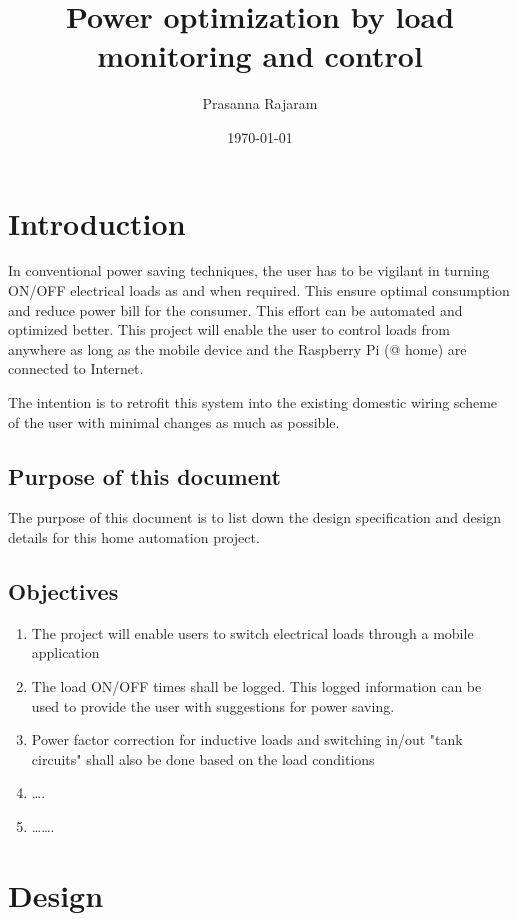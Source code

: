 \documentclass[11pt]{article}
\author{Prasanna Rajaram}
\date{\today}
\title{Power optimization by load monitoring and control}
\begin{document}
\maketitle
\tableofcontents

\section{Introduction}
\label{sec:org5ba7d53}
In conventional power saving techniques, the user has to be vigilant
in turning ON/OFF electrical loads as and when required. This ensure
optimal consumption and reduce power bill for the consumer. This
effort can be automated and optimized better. This project will enable
the user to control loads from anywhere as long as the mobile device
and the Raspberry Pi (@ home) are connected to Internet.  

The intention is to retrofit this system into the existing domestic
wiring scheme of the user with minimal changes as much as possible.

\subsection{Purpose of this document}
\label{sec:org6d773d9}
The purpose of this document is to list down the design specification
and design details for this home automation project. 

\subsection{Objectives}
\label{sec:orgab614ed}
\begin{enumerate}
\item The project will enable users to switch electrical loads through a
mobile application
\item The load ON/OFF times shall be logged. This logged information can
be used to provide the user with suggestions for power saving.
\item Power factor correction for inductive loads and switching in/out
"tank circuits" shall also be done based on the load conditions
\item \ldots{}.
\item \ldots{}\ldots{}.
\end{enumerate}

\section{Design}
\label{sec:orgc8df6f2}
\end{document}
